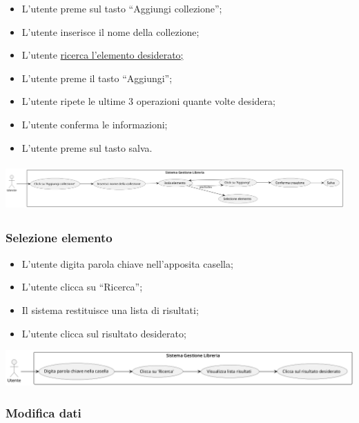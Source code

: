 \begin{itemize}
  \item
    L'utente preme sul tasto ``Aggiungi collezione'';
  \item
    L'utente inserisce il nome della collezione;
  \item
    L'utente \underline{ricerca l'elemento desiderato;}
  \item
    L'utente preme il tasto ``Aggiungi'';
  \item
    L'utente ripete le ultime 3 operazioni quante volte desidera;
  \item
    L'utente conferma le informazioni;
  \item
    L'utente preme sul tasto salva.
\end{itemize}

\begin{center}
  \includegraphics[width=5.10903in,height=0.70625in]{media/useCase2.png}
\end{center}

\subsubsection{Selezione elemento}\label{selezione-elemento}

\begin{itemize}
  \item
    L'utente digita parola chiave nell'apposita casella;
  \item
    L'utente clicca su ``Ricerca'';
  \item
    Il sistema restituisce una lista di risultati;
  \item
    L'utente clicca sul risultato desiderato;
\end{itemize}

\begin{center}
  \includegraphics[width=\textwidth]{media/useCase3.png}
\end{center}

\subsubsection{Modifica dati}\label{modifica-dati}

